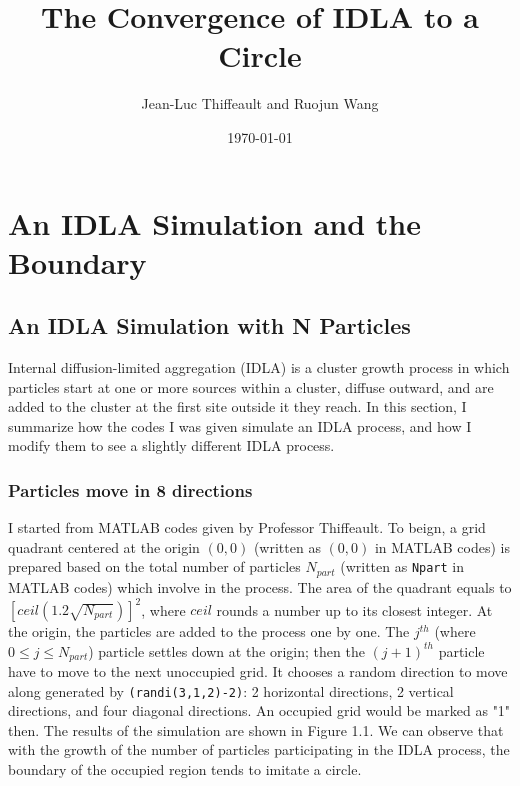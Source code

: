 \documentclass[letterpaper]{article}
\title{	
	\normalfont \normalsize 
	\huge The Convergence of IDLA to a Circle \\ %
}
\author{Jean-Luc Thiffeault and Ruojun Wang} %
\date{\normalsize\today} %
\numberwithin{equation}{section} %
\numberwithin{figure}{section} %
\numberwithin{table}{section} %
\begin{document}
	
\maketitle %
	

\section{An IDLA Simulation and the Boundary}

\subsection{An IDLA Simulation with N Particles}

Internal diffusion-limited aggregation (IDLA) is a cluster growth process in which particles start at one or more sources within a cluster, diffuse outward, and are added to the cluster at the first site outside it they reach. In this section, I summarize how the codes I was given simulate an IDLA process, and how I modify them to see a slightly different IDLA process.

\subsubsection{Particles move in 8 directions}
I started from  MATLAB codes given by Professor Thiffeault. To beign, a grid quadrant centered at the origin $(0,0)$ (written as $(0,0)$ in MATLAB codes) is prepared based on the total number of particles $N_{part}$ (written as \texttt{Npart} in MATLAB codes) which involve in the process. The area of the quadrant equals to $[ceil(1.2\sqrt{N_{part}})]^2$, where $ceil$ rounds a number up to its closest integer. At the origin, the particles are added to the process one by one. The $j^{th}$ (where $0 \leq j \leq N_{part}$) particle settles down at the origin; then the $(j+1)^{th}$ particle have to move to the next unoccupied grid. It chooses a random direction to move along generated by \texttt{(randi(3,1,2)-2)}: 2 horizontal directions, 2 vertical directions, and four diagonal directions. An occupied grid would be marked as "1" then. The results of the simulation are shown in Figure 1.1. We can observe that with the growth of the number of particles participating in the IDLA process, the boundary of the occupied region tends to imitate a circle.
\end{document}

